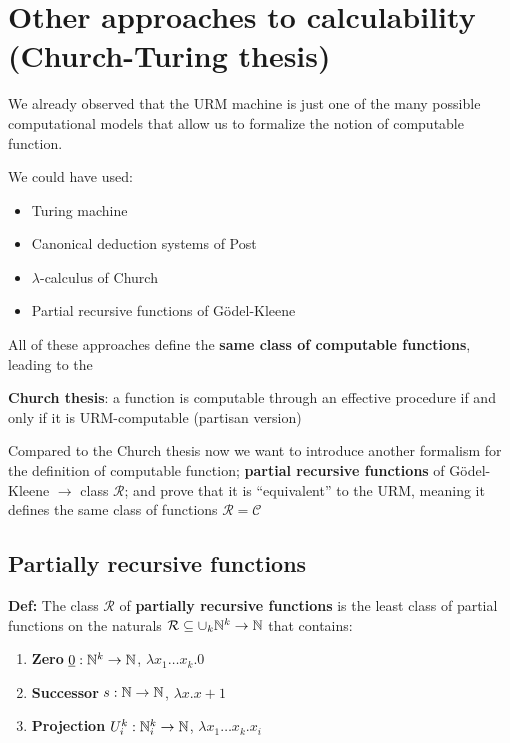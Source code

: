 \chapter{Other approaches to calculability (Church-Turing thesis)}
We already observed that the URM machine is just one of the many possible computational models that allow us to formalize the notion of computable function.

We could have used:
\begin{itemize}
\item Turing machine
\item Canonical deduction systems of Post
\item $\lambda$-calculus of Church
\item Partial recursive functions of Gödel-Kleene
\end{itemize}

All of these approaches define the \textbf{same class of computable functions}, leading to the

\textbf{Church thesis}: a function is computable through an effective procedure if and only if it is URM-computable (partisan version)

Compared to the Church thesis now we want to introduce another formalism for the definition of computable function; \textbf{partial recursive functions} of Gödel-Kleene $\rightarrow$ class $\mathcal{R}$; and prove that it is ``equivalent'' to the URM, meaning it defines the same class of functions $\mathcal{R} = \mathcal{C}$

\section{Partially recursive functions}

\textbf{Def:} The class $ \mathcal{R} $ of \textbf{partially recursive functions} is the least class of partial functions on the naturals $\mathcal{R}\subseteq \cup_k \mathbb{N}^k\rightarrow\mathbb{N}$ that contains:

\begin{enumerate}[label=(\alph*)]
\item \textbf{Zero} $ \underline{0}: \mathbb{N}^k \rightarrow \mathbb{N} $, $\lambda x_1\dots x_k . 0$
\item \textbf{Successor} $ s: \mathbb{N} \rightarrow \mathbb{N} $, $\lambda x . x+1$
\item \textbf{Projection} $ U_i^k: \mathbb{N}_i^k \rightarrow \mathbb{N} $,  $\lambda x_1\dots x_k . x_i$
\end{enumerate}

